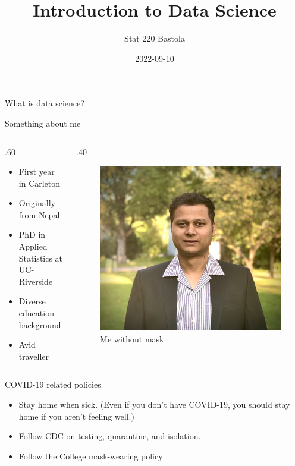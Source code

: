 \documentclass[
  10pt,
  ignorenonframetext,
]{beamer}
\title{Introduction to Data Science}
\author{Stat 220 Bastola}
\date{2022-09-10}
\def\begincols{\begin{columns}}
\def\begincol{\begin{column}}
\def\endcol{\end{column}}
\def\endcols{\end{columns}}
\begin{document}
\frame{\titlepage}

\begin{frame}{What is data science?}
\protect\hypertarget{what-is-data-science}{}
\end{frame}

\begin{frame}{Something about me}
\protect\hypertarget{something-about-me}{}
\begincols
  \begincol{.60\textwidth}
\begin{itemize}
    \item First year in Carleton
    \item Originally from Nepal
    \item PhD in Applied Statistics at UC-Riverside
    \item Diverse education background
    \item Avid traveller
\end{itemize}

\endcol
\begincol{.40\textwidth}

\begin{figure}
\centering
\includegraphics{Deepak.jpg}
\caption{Me without mask}
\end{figure}

\endcol \endcols
\end{frame}

\begin{frame}{COVID-19 related policies}
\protect\hypertarget{covid-19-related-policies}{}
\begin{itemize}
\item Stay home when sick. (Even if you don’t have COVID-19, you should stay home if you aren’t feeling well.)
\item Follow \href{https://www.cdc.gov/coronavirus/2019-ncov/vaccines/fully-vaccinated.html}{CDC} on testing, quarantine, and isolation.
\item Follow the College mask-wearing policy
\end{itemize}
\end{frame}
\end{document}
